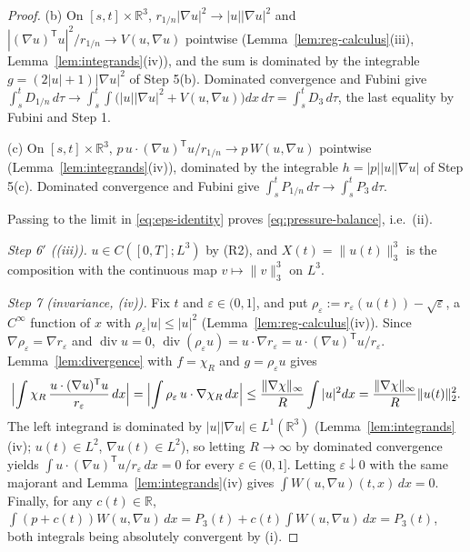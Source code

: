 \documentclass[11pt]{article}
\theoremstyle{definition}
\theoremstyle{plain}
\newcommand{\R}{\mathbb R}
\newcommand{\norm}[1]{\lVert #1\rVert}
\begin{document}
\begin{proof}
\begin{sloppypar}
(b) On $[s,t]\times\R^3$, $r_{1/n}|\nabla u|^2\to|u||\nabla u|^2$ and
$|(\nabla u)^{\mathsf T}u|^2/r_{1/n}\to V(u,\nabla u)$ pointwise
(Lemma~\ref{lem:reg-calculus}(iii), Lemma~\ref{lem:integrands}(iv)), and the
sum is dominated by the integrable $g=(2|u|+1)|\nabla u|^2$ of Step 5(b).
Dominated convergence and Fubini give
$\int_s^tD_{1/n}\,d\tau\to\int_s^t\!\int\bigl(|u||\nabla u|^2+V(u,\nabla u)\bigr)dx\,d\tau
=\int_s^tD_3\,d\tau$, the last equality by Fubini and Step 1.
\end{sloppypar}

(c) On $[s,t]\times\R^3$, $p\,u\cdot(\nabla u)^{\mathsf T}u/r_{1/n}\to p\,W(u,\nabla u)$
pointwise (Lemma~\ref{lem:integrands}(iv)), dominated by the integrable
$h=|p||u||\nabla u|$ of Step 5(c).  Dominated convergence and Fubini give
$\int_s^tP_{1/n}\,d\tau\to\int_s^tP_3\,d\tau$.

Passing to the limit in \eqref{eq:eps-identity} proves
\eqref{eq:pressure-balance}, i.e.\ (ii).

\emph{Step 6$'$ ((iii)).}  $u\in C([0,T];L^3)$ by (R2), and
$X(t)=\norm{u(t)}_3^3$ is the composition with the continuous map
$v\mapsto\norm v_3^3$ on $L^3$.

\emph{Step 7 (invariance, (iv)).}  Fix $t$ and $\varepsilon\in(0,1]$, and put
$\rho_\varepsilon:=r_\varepsilon(u(t))-\sqrt\varepsilon$, a $C^\infty$
function of $x$ with $\rho_\varepsilon|u|\leq|u|^2$
(Lemma~\ref{lem:reg-calculus}(iv)).  Since $\nabla\rho_\varepsilon=\nabla r_\varepsilon$
and $\operatorname{div}u=0$,
$\operatorname{div}(\rho_\varepsilon u)=u\cdot\nabla r_\varepsilon
=u\cdot(\nabla u)^{\mathsf T}u/r_\varepsilon$.  Lemma~\ref{lem:divergence}
with $f=\chi_R$ and $g=\rho_\varepsilon u$ gives
\[
 \Bigl|\int\chi_R\,\frac{u\cdot(\nabla u)^{\mathsf T}u}{r_\varepsilon}\,dx\Bigr|
 =\Bigl|\int\rho_\varepsilon\,u\cdot\nabla\chi_R\,dx\Bigr|
 \leq\frac{\norm{\nabla\chi}_\infty}{R}\int|u|^2dx
 =\frac{\norm{\nabla\chi}_\infty}{R}\norm{u(t)}_2^2 .
\]
The left integrand is dominated by $|u||\nabla u|\in L^1(\R^3)$
(Lemma~\ref{lem:integrands}(iv); $u(t)\in L^2$, $\nabla u(t)\in L^2$), so
letting $R\to\infty$ by dominated convergence yields
$\int u\cdot(\nabla u)^{\mathsf T}u/r_\varepsilon\,dx=0$ for every
$\varepsilon\in(0,1]$.  Letting $\varepsilon\downarrow0$ with the same
majorant and Lemma~\ref{lem:integrands}(iv) gives
$\int W(u,\nabla u)(t,x)\,dx=0$.  Finally, for any $c(t)\in\R$,
$\int(p+c(t))W(u,\nabla u)\,dx=P_3(t)+c(t)\int W(u,\nabla u)\,dx=P_3(t)$,
both integrals being absolutely convergent by (i).
\end{proof}
\end{document}
